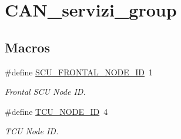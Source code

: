 \hypertarget{group___c_a_n__servizi__group}{}\section{C\+A\+N\+\_\+servizi\+\_\+group}
\label{group___c_a_n__servizi__group}
\subsection*{Macros}
\begin{DoxyCompactItemize}
\item 
\mbox{\label{group___c_a_n__servizi__group_ga8d64b6b4c0f02ebded5440c6250e03b9}} 
\#define \mbox{\hyperlink{group___c_a_n__servizi__group_ga8d64b6b4c0f02ebded5440c6250e03b9}{S\+C\+U\+\_\+\+F\+R\+O\+N\+T\+A\+L\+\_\+\+N\+O\+D\+E\+\_\+\+ID}}~1
\begin{DoxyCompactList}\small\item\em Frontal S\+CU Node ID. \end{DoxyCompactList}\item 
\mbox{\label{group___c_a_n__servizi__group_gaceef3f7366b39e88d89cb98ad8094c7b}} 
\#define \mbox{\hyperlink{group___c_a_n__servizi__group_gaceef3f7366b39e88d89cb98ad8094c7b}{T\+C\+U\+\_\+\+N\+O\+D\+E\+\_\+\+ID}}~4
\begin{DoxyCompactList}\small\item\em T\+CU Node ID. \end{DoxyCompactList}\end{DoxyCompactItemize}
